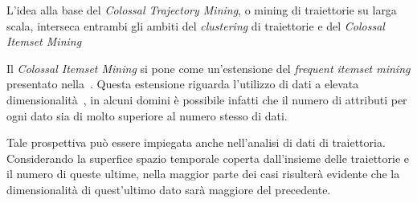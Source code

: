 L'idea alla base del \textit{Colossal Trajectory Mining},
o mining di traiettorie su larga scala, interseca entrambi gli ambiti del \textit{clustering} di traiettorie
e del \textit{Colossal Itemset Mining}

Il \textit{Colossal Itemset Mining} si pone come un'estensione del \textit{frequent itemset mining}
presentato nella~. Questa estensione riguarda l'utilizzo di dati
a elevata dimensionalità~\cite{zhu2007mining}, in alcuni domini è possibile infatti che il numero di attributi per ogni dato sia di molto superiore al numero stesso di dati.

Tale prospettiva può essere impiegata anche nell'analisi di dati di traiettoria. Considerando la superfice
spazio temporale coperta dall'insieme delle traiettorie e il numero di queste ultime, nella maggior parte dei casi risulterà evidente
che la dimensionalità di quest'ultimo dato sarà maggiore del precedente.
